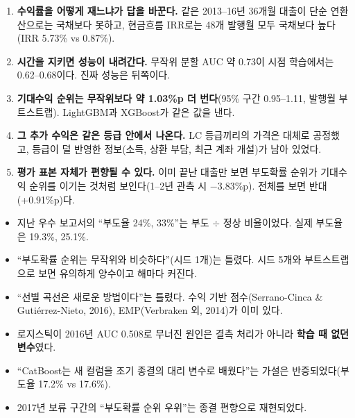 \begin{keybox}[이 프로젝트의 결론 다섯 줄]
\begin{enumerate}[leftmargin=*]
\item \textbf{수익률을 어떻게 재느냐가 답을 바꾼다.} 같은 2013--16년 36개월 대출이 단순 연환산으로는 국채보다 못하고, 현금흐름 IRR로는 48개 발행월 모두 국채보다 높다(IRR 5.73\% vs 0.87\%).
\item \textbf{시간을 지키면 성능이 내려간다.} 무작위 분할 AUC 약 0.73이 시점 학습에서는 0.62--0.68이다. 진짜 성능은 뒤쪽이다.
\item \textbf{기대수익 순위는 무작위보다 약 1.03\%p 더 번다}(95\% 구간 0.95--1.11, 발행월 부트스트랩). LightGBM과 XGBoost가 같은 값을 낸다.
\item \textbf{그 추가 수익은 같은 등급 안에서 나온다.} LC 등급끼리의 가격은 대체로 공정했고, 등급이 덜 반영한 정보(소득, 상환 부담, 최근 계좌 개설)가 남아 있었다.
\item \textbf{평가 표본 자체가 편향될 수 있다.} 이미 끝난 대출만 보면 부도확률 순위가 기대수익 순위를 이기는 것처럼 보인다(1--2년 관측 시 $-3.83$\%p). 전체를 보면 반대(+0.91\%p)다.
\end{enumerate}
\end{keybox}

\begin{warnbox}
\begin{itemize}[leftmargin=*]
\item 지난 우수 보고서의 ``부도율 24\%, 33\%''는 부도 \ensuremath{\div} 정상 비율이었다. 실제 부도율은 19.3\%, 25.1\%.
\item ``부도확률 순위는 무작위와 비슷하다''(시드 1개)는 틀렸다. 시드 5개와 부트스트랩으로 보면 유의하게 양수이고 해마다 커진다.
\item ``선별 곡선은 새로운 방법이다''는 틀렸다. 수익 기반 점수(Serrano-Cinca \& Guti\'errez-Nieto, 2016), EMP(Verbraken 외, 2014)가 이미 있다.
\item 로지스틱이 2016년 AUC 0.508로 무너진 원인은 결측 처리가 아니라 \textbf{학습 때 없던 변수}였다.
\item ``CatBoost는 새 컬럼을 조기 종결의 대리 변수로 배웠다''는 가설은 반증되었다(부도율 17.2\% vs 17.6\%).
\item 2017년 보류 구간의 ``부도확률 순위 우위''는 종결 편향으로 재현되었다.
\end{itemize}
\end{warnbox}
